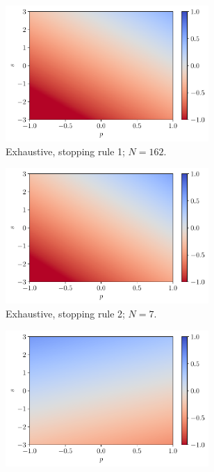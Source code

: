 \documentclass[a4paper, 12pt]{article}
\begin{document}
    \begin{figure}[H]
        \centering
        \begin{subfigure}{0.49\textwidth}
            \centering
            \includegraphics[width=0.85\textwidth]{resources/pdf/4_exhaustive_1_LR_q_-4.pdf}
            \caption{Exhaustive, stopping rule 1; $N = 162$.}
            \vspace{0.5em}
        \end{subfigure}
        \hfill
        \begin{subfigure}{0.49\textwidth}
            \centering
            \includegraphics[width=0.85\textwidth]{resources/pdf/4_exhaustive_2_LR_q_-4.pdf}
            \caption{Exhaustive, stopping rule 2; $N = 7$.}
            \vspace{0.5em}
        \end{subfigure}
        \begin{subfigure}{0.49\textwidth}
            \centering
            \includegraphics[width=0.85\textwidth]{resources/pdf/4_montecarlo_1_LR_q_-4.pdf}

\end{subfigure}
\end{figure}
\end{document}
